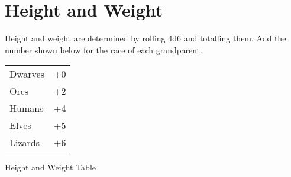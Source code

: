 \section{Height and Weight}
Height and weight are determined by rolling 4d6 and totalling them. Add the number shown below for the race of each grandparent.
\begin{tcolorbox}[breakable,boxrule=0pt]
\begin{tabular}{l l}
Dwarves & +0\\
Orcs & +2\\
Humans & +4\\
Elves & +5\\
Lizards & +6\\
\end{tabular}
\end{tcolorbox}
\begin{center}
\large
Height and Weight Table\\
\end{center}
\normalsize
